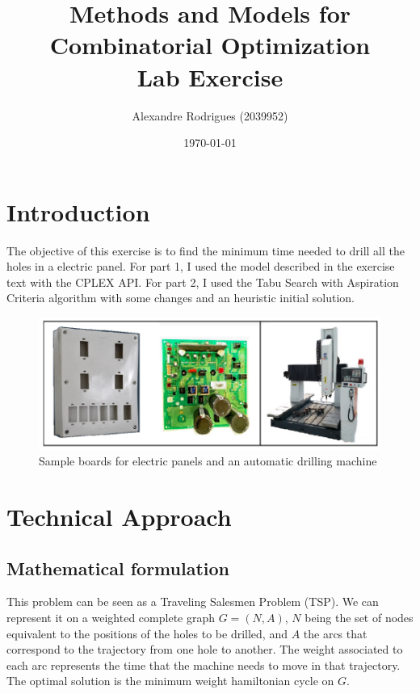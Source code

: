 \documentclass[a4paper,12pt]{article}
\begin{document}
	
	\title{{\Huge Methods and Models for \\ Combinatorial Optimization} \\ Lab Exercise}
	\author{ Alexandre Rodrigues (2039952)}
	\date{\today}
	\maketitle
	
	
	\section*{Introduction}
		The objective of this exercise is to find the minimum time needed to drill all the holes in a electric panel.
		For part 1, I used the model described in the exercise text with the CPLEX API.
		For part 2, I used the Tabu Search with Aspiration Criteria algorithm with some changes and an heuristic initial solution.
		
		\vspace{3cm}
		
		\begin{figure}[H]
			\centering
			\includegraphics[width=.99\linewidth]{pic1.png}  
			\caption{Sample boards for electric panels and an automatic drilling machine}
			\label{fig:fig1}
		\end{figure}
	
	\pagebreak
	
	\tableofcontents
	
	\pagebreak
		
		
	\section{Technical Approach}
	
		\subsection{Mathematical formulation}
			This problem can be seen as a Traveling Salesmen Problem (TSP).
			We can represent it on a weighted complete graph $ G =(N,A) $, $ N $ being the set of nodes equivalent to the positions of the holes to be drilled, and $ A $ the arcs that correspond to the trajectory from one hole to another.
			The weight associated to each arc represents the time that the machine needs to move in that trajectory.
			The optimal solution is the minimum weight hamiltonian cycle on $ G $.
			
\end{document}
